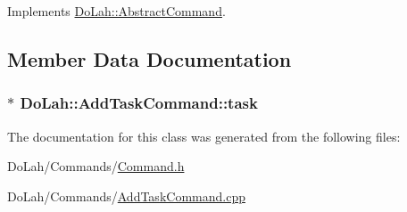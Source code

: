 Implements \hyperlink{class_do_lah_1_1_abstract_command_a9760328f2d6b85d8edc803a97a29dfc0}{Do\+Lah\+::\+Abstract\+Command}.



\subsection{Member Data Documentation}
\hypertarget{class_do_lah_1_1_add_task_command_ab64cfc7944aa72288f732a7e3de057b2}{}
\subsubsection[{task}]{$\ast$ Do\+Lah\+::\+Add\+Task\+Command\+::task\hspace{0.3cm}{\ttfamily [private]}}\label{class_do_lah_1_1_add_task_command_ab64cfc7944aa72288f732a7e3de057b2}


The documentation for this class was generated from the following files\+:\begin{DoxyCompactItemize}
\item 
Do\+Lah/\+Commands/\hyperlink{_command_8h}{Command.\+h}\item 
Do\+Lah/\+Commands/\hyperlink{_add_task_command_8cpp}{Add\+Task\+Command.\+cpp}\end{DoxyCompactItemize}
